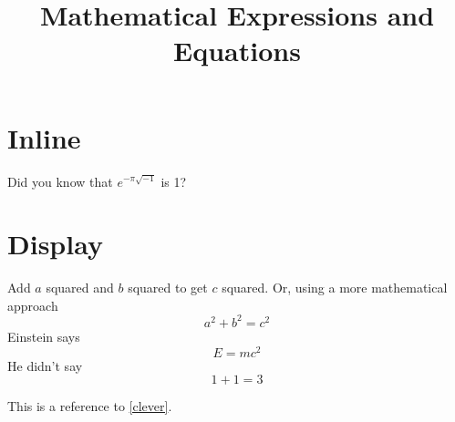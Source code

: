 \documentclass{article}
\title{Mathematical Expressions and Equations}
\begin{document}
    \maketitle
    \section*{Inline}
	Did you know that $e^{-\pi\sqrt{-1}}$ is 1?

    \section*{Display}
    Add $a$ squared and $b$ squared
    to get $c$ squared. Or, using
    a more mathematical approach
    \begin{equation}
    a^2 + b^2 = c^2
    \end{equation}
    Einstein says
    \begin{equation}
    E = mc^2 \label{clever}
    \end{equation}
    He didn’t say
    \begin{equation}
    1 + 1 = 3 \tag{dumb}
    \end{equation}

    \pagebreak

    This is a reference to
    \ref{clever}.    
\end{document}
